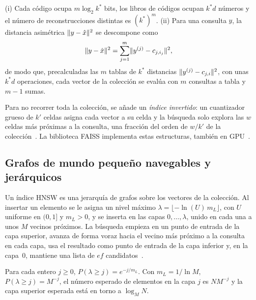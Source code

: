 \begin{proposicion}\label{prop:pq}
(i) Cada código ocupa $m\log_2 k^\ast$ bits, los libros de códigos ocupan $k^\ast d$ números y el número de reconstrucciones distintas es $(k^\ast)^{m}$. (ii) Para una consulta $y$, la distancia asimétrica $\lVert y-\hat x\rVert^{2}$ se descompone como
\[
\lVert y-\hat x\rVert^{2}=\sum_{j=1}^{m}\lVert y^{(j)}-c_{j,i_j}\rVert^{2},
\]
de modo que, precalculadas las $m$ tablas de $k^\ast$ distancias $\lVert y^{(j)}-c_{j,i}\rVert^{2}$, con unas $k^\ast d$ operaciones, cada vector de la colección se evalúa con $m$ consultas a tabla y $m-1$ sumas.
\end{proposicion}

\addtocounter{definicion}{1}%

Para no recorrer toda la colección, se añade un \emph{índice invertido}: un cuantizador grueso de $k'$ celdas asigna cada vector a su celda y la búsqueda solo explora las $w$ celdas más próximas a la consulta, una fracción del orden de $w/k'$ de la colección~\cite{jegou}. La biblioteca FAISS implementa estas estructuras, también en GPU~\cite{faiss}.

\subsection{Grafos de mundo pequeño navegables y jerárquicos}

\begin{definicion}[HNSW]\label{def:hnsw}
Un índice HNSW es una jerarquía de grafos sobre los vectores de la colección. Al insertar un elemento se le asigna un nivel máximo $\lambda=\lfloor-\ln(U)\,m_L\rfloor$, con $U$ uniforme en $(0,1]$ y $m_L>0$, y se inserta en las capas $0,\dots,\lambda$, unido en cada una a unos $M$ vecinos próximos. La búsqueda empieza en un punto de entrada de la capa superior, avanza de forma voraz hacia el vecino más próximo a la consulta en cada capa, usa el resultado como punto de entrada de la capa inferior y, en la capa~0, mantiene una lista de $\mathit{ef}$ candidatos~\cite{hnsw}.
\end{definicion}

\begin{proposicion}\label{prop:hnsw}
Para cada entero $j\ge 0$, $P(\lambda\ge j)=e^{-j/m_L}$. Con $m_L=1/\ln M$, $P(\lambda\ge j)=M^{-j}$, el número esperado de elementos en la capa $j$ es $NM^{-j}$ y la capa superior esperada está en torno a $\log_M N$.
\end{proposicion}


